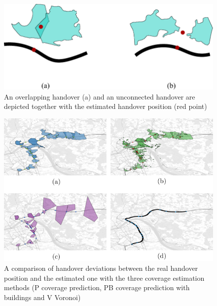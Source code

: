 \documentclass[twocolumn]{bmcart}%
\begin{document}
\begin{backmatter}
\begin{figure}[h!]
      \end{figure}
\begin{figure}[h!]
\label{fig:handover}
  \caption{ An overlapping handover (a) and an unconnected handover are depicted together with the estimated handover position (red point)
      }
      \includegraphics[width=0.9\columnwidth]{handover}
\end{figure}

\begin{figure}[h!]
\label{fig:563}
  \caption{ A comparison of handover deviations between the real handover position and the estimated one with the three coverage estimation methods (P coverage prediction, PB coverage prediction with buildings and V Voronoi)
      }
      \includegraphics[height=0.40\textheight]{images/563standalone.png}
\end{figure}




\end{backmatter}
\end{document}
